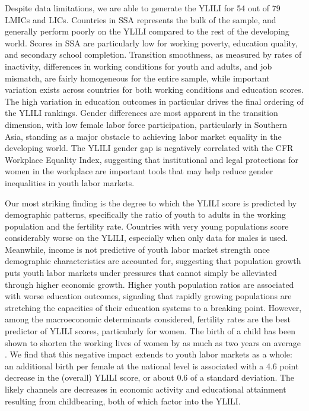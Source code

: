 \documentclass[
  a4paper, twoside, 12pt]{book}
\begin{document}
Despite data limitations, we are able to generate the YLILI for 54 out of 79 LMICs and LICs. Countries in SSA represents the bulk of the sample, and generally perform poorly on the YLILI compared to the rest of the developing world. Scores in SSA are particularly low for working poverty, education quality, and secondary school completion. Transition smoothness, as measured by rates of inactivity, differences in working conditions for youth and adults, and job mismatch, are fairly homogeneous for the entire sample, while important variation exists across countries for both working conditions and education scores. The high variation in education outcomes in particular drives the final ordering of the YLILI rankings. Gender differences are most apparent in the transition dimension, with low female labor force participation, particularly in Southern Asia, standing as a major obstacle to achieving labor market equality in the developing world. The YLILI gender gap is negatively correlated with the CFR Workplace Equality Index, suggesting that institutional and legal protections for women in the workplace are important tools that may help reduce gender inequalities in youth labor markets.

Our most striking finding is the degree to which the YLILI score is predicted by demographic patterns, specifically the ratio of youth to adults in the working population and the fertility rate. Countries with very young populations score considerably worse on the YLILI, especially when only data for males is used. Meanwhile, income is not predictive of youth labor market strength once demographic characteristics are accounted for, suggesting that population growth puts youth labor markets under pressures that cannot simply be alleviated through higher economic growth. Higher youth population ratios are associated with worse education outcomes, signaling that rapidly growing populations are stretching the capacities of their education systems to a breaking point. However, among the macroeconomic determinants considered, fertility rates are the best predictor of YLILI scores, particularly for women. The birth of a child has been shown to shorten the working lives of women by as much as two years on average \autocite{bloom2009}. We find that this negative impact extends to youth labor markets as a whole: an additional birth per female at the national level is associated with a 4.6 point decrease in the (overall) YLILI score, or about 0.6 of a standard deviation. The likely channels are decreases in economic activity and educational attainment resulting from childbearing, both of which factor into the YLILI.
\end{document}
